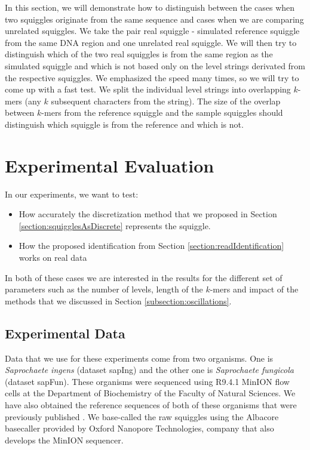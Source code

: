 In this section, we will demonstrate how to distinguish between the cases when two squiggles
originate from the same sequence and cases when we are comparing unrelated squiggles.
We take the pair real squiggle - simulated reference squiggle from the same DNA region and one unrelated real squiggle.
We will then try to distinguish which of the two real squiggles is from the same region as the simulated squiggle
and which is not based only on the level strings derivated from the respective squiggles. We
emphasized the speed many times, so we will try to come up with a fast test.
We split the individual level strings into overlapping $k$-mers (any $k$ subsequent
characters from the string). The size of the overlap between $k$-mers from the reference
squiggle and the sample squiggles should distinguish which squiggle is from the reference and which is not.

\section{Experimental Evaluation}

In our experiments, we want to test:

\begin{itemize}
    \item How accurately the discretization method that we proposed in Section \ref{section:squigglesAsDiscrete} represents the squiggle.
    \item How the proposed identification from Section \ref{section:readIdentification} works on real data
\end{itemize}

In both of these cases we are interested in the results for the different set of parameters
such as the number of levels, length of the $k$-mers and impact of the methods that we
discussed in Section \ref{subsection:oscillations}.

\subsection{Experimental Data}
\label{section:data}

Data that we use for these experiments come from two organisms.
One is \emph{Saprochaete ingens} (dataset sapIng) and
the other one is \emph{Saprochaete fungicola} (dataset sapFun). These
organisms were sequenced using R9.4.1 MinION flow cells at the Department of Biochemistry
of the Faculty of Natural Sciences. We have also obtained the reference sequences of
both of these organisms that were previously published \cite{hodorova2019genome} \cite{brejova2019genome}.
We base-called the raw squiggles using the Albacore basecaller provided by Oxford Nanopore Technologies,
company that also develops the MinION sequencer.

